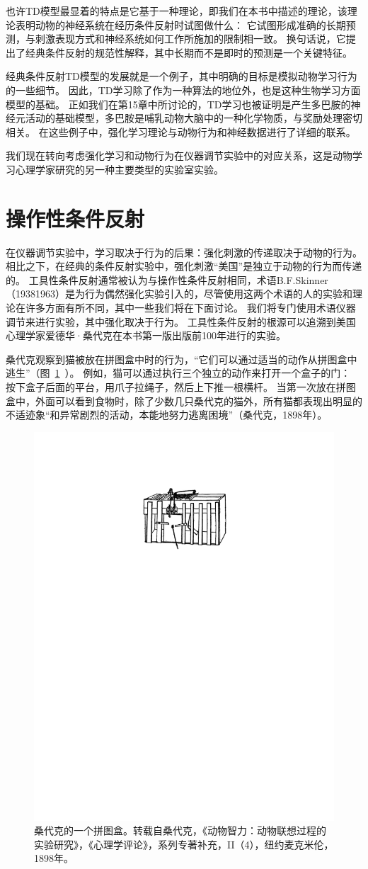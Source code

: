 {也许TD模型最显着的特点是它基于一种理论，即我们在本书中描述的理论，该理论表明动物的神经系统在经历条件反射时试图做什么：
它试图形成准确的长期预测，与刺激表现方式和神经系统如何工作所施加的限制相一致。
换句话说，它提出了经典条件反射的规范性解释，其中长期而不是即时的预测是一个关键特征。


经典条件反射TD模型的发展就是一个例子，其中明确的目标是模拟动物学习行为的一些细节。
因此，TD学习除了作为一种算法的地位外，也是这种生物学习方面模型的基础。
正如我们在第15章中所讨论的，TD学习也被证明是产生多巴胺的神经元活动的基础模型，多巴胺是哺乳动物大脑中的一种化学物质，与奖励处理密切相关。
在这些例子中，强化学习理论与动物行为和神经数据进行了详细的联系。


我们现在转向考虑强化学习和动物行为在仪器调节实验中的对应关系，这是动物学习心理学家研究的另一种主要类型的实验室实验。


\section{操作性条件反射}

在仪器调节实验中，学习取决于行为的后果：强化刺激的传递取决于动物的行为。
相比之下，在经典的条件反射实验中，强化刺激“美国”是独立于动物的行为而传递的。
工具性条件反射通常被认为与操作性条件反射相同，术语B.F.Skinner（19381963）是为行为偶然强化实验引入的，尽管使用这两个术语的人的实验和理论在许多方面有所不同，其中一些我们将在下面讨论。
我们将专门使用术语仪器调节来进行实验，其中强化取决于行为。
工具性条件反射的根源可以追溯到美国心理学家爱德华·桑代克在本书第一版出版前100年进行的实验。


桑代克观察到猫被放在拼图盒中时的行为，“它们可以通过适当的动作从拼图盒中逃生”（图~\ref{fig:11_7}~）。
例如，猫可以通过执行三个独立的动作来打开一个盒子的门：
按下盒子后面的平台，用爪子拉绳子，然后上下推一根横杆。
当第一次放在拼图盒中，外面可以看到食物时，除了少数几只桑代克的猫外，所有猫都表现出明显的不适迹象“和异常剧烈的活动，本能地努力逃离困境”（桑代克，1898年）。


\begin{figure}[!htb]
	\centering
	\includegraphics[width=0.5\linewidth]{chap11/fig_11_7}
	\caption{桑代克的一个拼图盒。转载自桑代克，《动物智力：动物联想过程的实验研究》，《心理学评论》，系列专著补充，II（4），纽约麦克米伦，1898年。  \label{fig:11_7}}
\end{figure}

}
